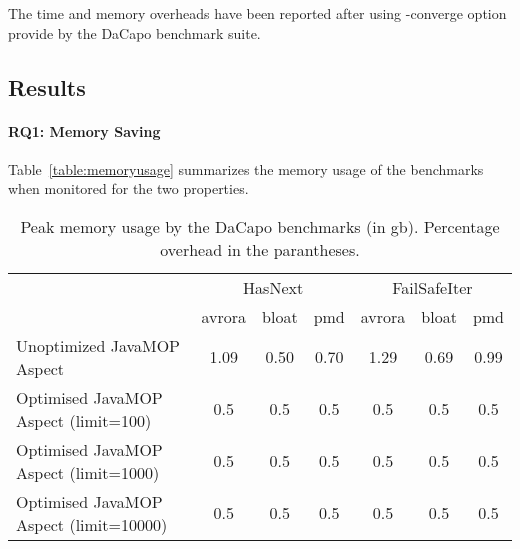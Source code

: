 The time and memory overheads have been reported after using -converge option provide by the DaCapo benchmark suite.

\subsection{Results}
\label{sec:results}

\paragraph{RQ1: Memory Saving}

Table~\ref{table:memoryusage} summarizes the memory usage of the benchmarks when monitored for the two properties.





\begin{table*}[!ht]
\centering
\begin{tabular}{|p{4cm}|c|c|c|c|c|c|}
\hline
  \multirow{2}{*}{}                                 & \multicolumn{3}{c|}{HasNext}           & \multicolumn{3}{c|}{FailSafeIter}             \\ \cline{2-7}                                              
                    & avrora           & bloat         & pmd      & avrora           & bloat         & pmd \\ \hline
Unoptimized JavaMOP Aspect     & 1.09 & 0.50 & 0.70  & 1.29 & 0.69 & 0.99 \\ \hline
Optimised JavaMOP Aspect (limit=100)   & 0.5  & 0.5  & 0.5   & 0.5  & 0.5  & 0.5   \\ \hline
Optimised JavaMOP Aspect (limit=1000)   & 0.5  & 0.5  & 0.5   & 0.5  & 0.5  & 0.5   \\ \hline
Optimised JavaMOP Aspect (limit=10000)   & 0.5  & 0.5  & 0.5   & 0.5  & 0.5  & 0.5   \\ \hline

\end{tabular}
\caption{Peak memory usage by the DaCapo benchmarks (in gb). Percentage overhead in the parantheses.}
\end{table*}
\label{table:memoryusage}



